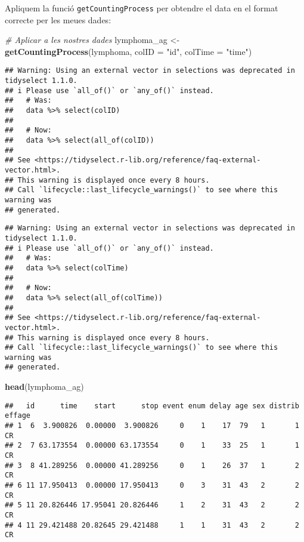 \documentclass[
]{article}
\newenvironment{Shaded}{\begin{snugshade}}{\end{snugshade}}
\newcommand{\AttributeTok}[1]{\textcolor[rgb]{0.13,0.29,0.53}{#1}}
\newcommand{\CommentTok}[1]{\textcolor[rgb]{0.56,0.35,0.01}{\textit{#1}}}
\newcommand{\FunctionTok}[1]{\textcolor[rgb]{0.13,0.29,0.53}{\textbf{#1}}}
\newcommand{\NormalTok}[1]{#1}
\newcommand{\OtherTok}[1]{\textcolor[rgb]{0.56,0.35,0.01}{#1}}
\newcommand{\StringTok}[1]{\textcolor[rgb]{0.31,0.60,0.02}{#1}}
\begin{document}
Apliquem la funció \texttt{getCountingProcess} per obtendre el data en
el format correcte per les meues dades:

\begin{Shaded}
\begin{Highlighting}[]
\CommentTok{\# Aplicar a les nostres dades}
\NormalTok{lymphoma\_ag }\OtherTok{\textless{}{-}} \FunctionTok{getCountingProcess}\NormalTok{(lymphoma, }\AttributeTok{colID =} \StringTok{"id"}\NormalTok{, }\AttributeTok{colTime =} \StringTok{"time"}\NormalTok{)}
\end{Highlighting}
\end{Shaded}

\begin{verbatim}
## Warning: Using an external vector in selections was deprecated in tidyselect 1.1.0.
## i Please use `all_of()` or `any_of()` instead.
##   # Was:
##   data %>% select(colID)
## 
##   # Now:
##   data %>% select(all_of(colID))
## 
## See <https://tidyselect.r-lib.org/reference/faq-external-vector.html>.
## This warning is displayed once every 8 hours.
## Call `lifecycle::last_lifecycle_warnings()` to see where this warning was
## generated.
\end{verbatim}

\begin{verbatim}
## Warning: Using an external vector in selections was deprecated in tidyselect 1.1.0.
## i Please use `all_of()` or `any_of()` instead.
##   # Was:
##   data %>% select(colTime)
## 
##   # Now:
##   data %>% select(all_of(colTime))
## 
## See <https://tidyselect.r-lib.org/reference/faq-external-vector.html>.
## This warning is displayed once every 8 hours.
## Call `lifecycle::last_lifecycle_warnings()` to see where this warning was
## generated.
\end{verbatim}

\begin{Shaded}
\begin{Highlighting}[]
\FunctionTok{head}\NormalTok{(lymphoma\_ag)}
\end{Highlighting}
\end{Shaded}

\begin{verbatim}
##   id      time    start      stop event enum delay age sex distrib effage
## 1  6  3.900826  0.00000  3.900826     0    1    17  79   1       1     CR
## 2  7 63.173554  0.00000 63.173554     0    1    33  25   1       1     CR
## 3  8 41.289256  0.00000 41.289256     0    1    26  37   1       2     CR
## 6 11 17.950413  0.00000 17.950413     0    3    31  43   2       2     CR
## 5 11 20.826446 17.95041 20.826446     1    2    31  43   2       2     CR
## 4 11 29.421488 20.82645 29.421488     1    1    31  43   2       2     CR
\end{verbatim}
\end{document}
